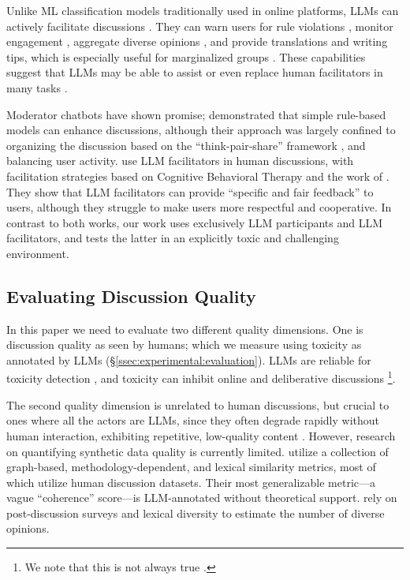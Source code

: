 Unlike \ac{ML} classification models traditionally used in online platforms, \acp{LLM} can actively facilitate discussions \cite{korre2025evaluation}. They can warn users for rule violations \cite{Kumar_AbuHashem_Durumeric_2024}, monitor engagement \cite{schroeder-etal-2024-fora}, aggregate diverse opinions \cite{small-polis-llm}, and provide translations and writing tips, which is especially useful for marginalized groups \cite{Tsai2024Generative}. These capabilities suggest that \acp{LLM} may be able to assist or even replace human facilitators in many tasks \cite{small-polis-llm, seering_self_moderation}.

Moderator chatbots have shown promise; \citet{kim_et_al_chatbot} demonstrated that simple rule-based models can enhance discussions, although their approach was largely confined to organizing the discussion based on the ``think-pair-share'' framework \cite{ahmad_2010_supporting, Navajas2018}, and balancing user activity. \citet{cho-etal-2024-language} use \ac{LLM} facilitators in human discussions, with facilitation strategies based on Cognitive Behavioral Therapy and the work of \citet{rosenberg2015nonviolent}. They show that \ac{LLM} facilitators can provide “specific and fair feedback” to users, although they struggle to make users more respectful and cooperative.  In contrast to both works, our work uses exclusively \ac{LLM} participants and \ac{LLM} facilitators, and tests the latter in an explicitly toxic and challenging environment.


\subsection{Evaluating Discussion Quality}
\label{ssec:related:quality}

In this paper we need to evaluate two different quality dimensions. One is discussion quality as seen by humans; which we measure using toxicity as annotated by \acp{LLM}  (\S\ref{ssec:experimental:evaluation}). \acp{LLM} are reliable for toxicity detection \citep{kang-qian-2024-implanting, Wang2022ToxicityDW, anjum2024hate}, and toxicity can inhibit online and deliberative discussions \citep{dekock2022disagree, XiaToxicity}\footnote{We note that this is not always true \citep{Avalle2024PersistentIP}.}. 

The second quality dimension is unrelated to human discussions, but crucial to ones where all the actors are \acp{LLM}, since they often degrade rapidly without human interaction, exhibiting repetitive, low-quality content \citep{ulmer2024}. However, research on quantifying synthetic data quality is currently limited. \citet{balog_2024} utilize a collection of graph-based, methodology-dependent, and lexical similarity metrics, most of which utilize human discussion datasets. Their most generalizable metric—a vague ``coherence'' score—is \ac{LLM}-annotated without theoretical support. \citet{kim_et_al_chatbot} rely on post-discussion surveys and lexical diversity to estimate the number of diverse opinions. 

